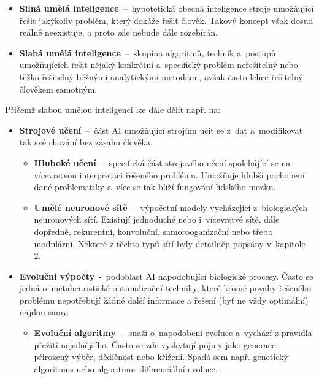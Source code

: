 \documentclass[a4paper,12pt]{article}
\begin{document}
{{{{{{{{\begin{itemize}
\item \textbf{Silná umělá inteligence}~--~hypotetická obecná inteligence stroje umožňující řešit jakýkoliv problém, který dokáže řešit člověk. Takový koncept však dosud reálně neexistuje, a proto zde nebude dále rozebírán.
\item \textbf{Slabá umělá inteligence}~--~skupina algoritmů, technik a~postupů umožňujících řešit nějaký konkrétní a~specifický problém neřešitelný nebo těžko řešitelný běžnými analytickými metodami, avšak často lehce řešitelný člověkem samotným.

\end{itemize}

Přičemž slabou umělou inteligenci lze dále dělit např. na:

\begin{itemize}
\item \textbf{Strojové učení}~--~část AI umožňující strojům učit se z~dat a~modifikovat tak své chování bez zásahu člověka.

\begin{itemize}

\item \textbf{Hluboké učení}~--~specifická část strojového učení spolehájící se na vícevrstvou interpretaci řešeného problému. Umožňuje hlubší pochopení dané problematiky a~více se tak blíží fungování lidského mozku.

\item \textbf{Umělé neuronové sítě}~--~výpočetní modely vycházející z~biologických neuronových sítí. Existují jednoduché nebo i~vícevrstvé sítě, dále dopředné, rekurentní, konvoluční, samorooganizační nebo třeba modulární. Některé z těchto typů sítí byly detailněji popsány v~kapitole 2.

\end{itemize}

\item \textbf{Evoluční výpočty}~-~podoblast AI napodobující biologické procesy. Často se jedná o~metaheuristické optimalizační techniky, které kromě povahy řešeného problému nepotřebují žádné další informace a řešení (byť ne vždy optimální) najdou samy.

\begin{itemize}
\item \textbf{Evoluční algoritmy}~--~snaží o~napodobení evoluce a~vychází z pravidla přežití nejsilnějšího. Často se zde vyskytují pojmy jako generace, přirozený výběr, dědíčnost nebo křížení. Spadá sem např. genetický algoritmus nebo algoritmus diferenciální evoluce.


\end{itemize}
\end{itemize}}}}}}}}}
\end{document}

